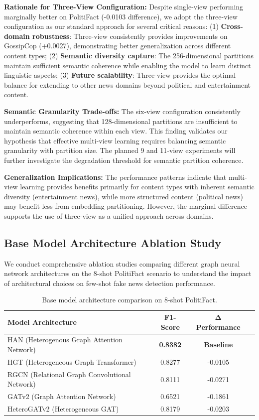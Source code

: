 \textbf{Rationale for Three-View Configuration:} Despite single-view performing marginally better on PolitiFact (-0.0103 difference), we adopt the three-view configuration as our standard approach for several critical reasons: (1) \textbf{Cross-domain robustness}: Three-view consistently provides improvements on GossipCop (+0.0027), demonstrating better generalization across different content types; (2) \textbf{Semantic diversity capture}: The 256-dimensional partitions maintain sufficient semantic coherence while enabling the model to learn distinct linguistic aspects; (3) \textbf{Future scalability}: Three-view provides the optimal balance for extending to other news domains beyond political and entertainment content.

\textbf{Semantic Granularity Trade-offs:} The six-view configuration consistently underperforms, suggesting that 128-dimensional partitions are insufficient to maintain semantic coherence within each view. This finding validates our hypothesis that effective multi-view learning requires balancing semantic granularity with partition size. The planned 9 and 11-view experiments will further investigate the degradation threshold for semantic partition coherence.

\textbf{Generalization Implications:} The performance patterns indicate that multi-view learning provides benefits primarily for content types with inherent semantic diversity (entertainment news), while more structured content (political news) may benefit less from embedding partitioning. However, the marginal difference supports the use of three-view as a unified approach across domains.

\subsection{Base Model Architecture Ablation Study}

We conduct comprehensive ablation studies comparing different graph neural network architectures on the 8-shot PolitiFact scenario to understand the impact of architectural choices on few-shot fake news detection performance.

\begin{table}[htbp]
\centering
\caption{Base model architecture comparison on 8-shot PolitiFact.}
\label{tab:base_model_ablation}
\begin{tabular}{lccc}
\toprule
\textbf{Model Architecture} & \textbf{F1-Score} & \textbf{Δ Performance} \\
\midrule
HAN (Heterogenous Graph Attention Network) & \textbf{0.8382} & \textbf{Baseline} \\
HGT (Heterogeneous Graph Transformer) & 0.8277 & -0.0105 \\
RGCN (Relational Graph Convolutional Network) & 0.8111 & -0.0271 \\
GATv2 (Graph Attention Network) & 0.6521 & -0.1861 \\ 
HeteroGATv2 (Heterogeneous GAT) & 0.8179 & -0.0203 \\
\bottomrule
\end{tabular}
\end{table}

